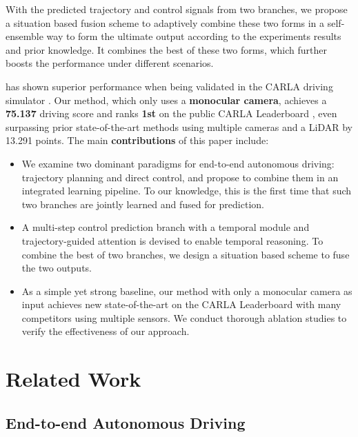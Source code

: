 \documentclass{article}
\begin{document}
With the predicted trajectory and control signals from two branches, we propose a situation based fusion scheme to adaptively combine these two forms in a self-ensemble way to form the ultimate output according to the experiments results and prior knowledge.
It combines the best of these two forms, which further boosts the performance under different scenarios.



\algname has shown superior performance when being validated in the CARLA driving simulator \citep{Dosovitskiy17carla}. Our method, which only uses a \textbf{monocular camera}, achieves a \textbf{75.137} driving score and ranks \textbf{1st} on the public CARLA Leaderboard \citep{carlaleaderboard}, even surpassing prior state-of-the-art methods using multiple cameras and a LiDAR by 13.291 points. The main \textbf{contributions} of this paper include:
\begin{itemize}
\item We examine two dominant paradigms for end-to-end autonomous driving: trajectory planning and direct control, and propose to combine them in an integrated learning pipeline. To our knowledge, this is the first time that such two branches are jointly learned and fused for prediction.



\item 
A multi-step control prediction branch with a temporal module and trajectory-guided attention is devised to enable temporal reasoning. To combine the best of two branches, we design a situation based scheme to fuse the two outputs. 



\item As a simple yet strong baseline, our method with only a monocular camera as input achieves new state-of-the-art on the CARLA Leaderboard with many competitors using multiple sensors. We conduct thorough ablation studies to verify the effectiveness of our approach.
\end{itemize}


\section{Related Work} \label{sec:related_work}
\subsection{End-to-end Autonomous Driving}
\end{document}
